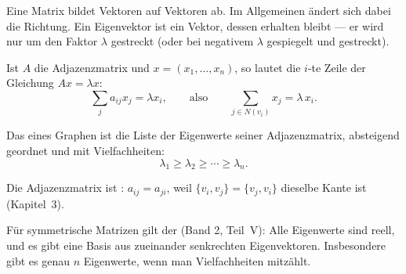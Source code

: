 \begin{merksatz}
Eine Matrix bildet Vektoren auf Vektoren ab. Im Allgemeinen ändert sich dabei die Richtung. Ein Eigenvektor ist ein Vektor, dessen  erhalten bleibt --- er wird nur um den Faktor $\lambda$ gestreckt (oder bei negativem $\lambda$ gespiegelt und gestreckt).

Ist $A$ die Adjazenzmatrix und $x = (x_1, \ldots, x_n)$, so lautet die $i$-te Zeile der Gleichung $Ax = \lambda x$:
\[ \sum_{j} a_{ij} x_j = \lambda x_i , \qquad \text{also} \qquad \sum_{j \in N(v_i)} x_j = \lambda\, x_i . \]

\begin{center}
\begin{minipage}{0.88\textwidth}
\end{minipage}
\end{center}
\end{merksatz}

\begin{definition}
Das  eines Graphen ist die Liste der Eigenwerte seiner Adjazenzmatrix, absteigend geordnet und mit Vielfachheiten:
\[ \lambda_1 \ge \lambda_2 \ge \cdots \ge \lambda_n . \]
\end{definition}

\begin{merksatz}
Die Adjazenzmatrix ist : $a_{ij} = a_{ji}$, weil $\{v_i,v_j\} = \{v_j,v_i\}$ dieselbe Kante ist (Kapitel~3).

Für symmetrische Matrizen gilt der  (Band 2, Teil~V): Alle Eigenwerte sind reell, und es gibt eine Basis aus zueinander senkrechten Eigenvektoren. Insbesondere gibt es genau $n$ Eigenwerte, wenn man Vielfachheiten mitzählt.

\begin{center}
\begin{minipage}{0.88\textwidth}
\end{minipage}
\end{center}
\end{merksatz}

